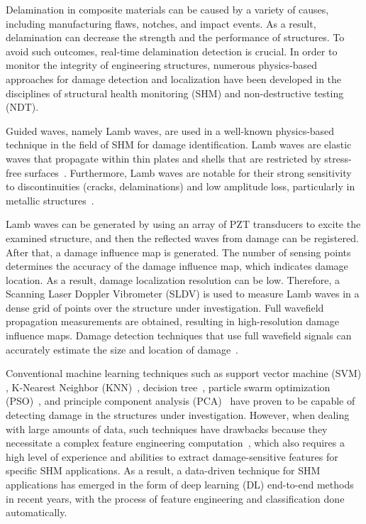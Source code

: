 \documentclass[runningheads]{llncs}
\begin{document}
Delamination in composite materials can be caused by a variety of causes, including manufacturing flaws, notches, and impact events.
As a result, delamination can decrease the strength and the performance of structures.
To avoid such outcomes, real-time delamination detection is crucial.
In order to monitor the integrity of engineering structures, numerous physics-based approaches for damage detection and localization have been developed in the disciplines of structural health monitoring (SHM) and non-destructive testing (NDT).

Guided waves, namely Lamb waves, are used in a well-known physics-based technique in the field of SHM for damage identification.
Lamb waves are elastic waves that propagate within thin plates and shells that are restricted by stress-free surfaces~\cite{mitra2016guided}.
Furthermore, Lamb waves are notable for their strong sensitivity to discontinuities (cracks, delaminations) and low amplitude loss, particularly in metallic structures~\cite{Keulen2014}.

Lamb waves can be generated by using an array of PZT transducers to excite the examined structure, and then the reflected waves from damage can be registered.
After that, a damage influence map is generated.
The number of sensing points determines the accuracy of the damage influence map, which indicates damage location.
As a result, damage localization resolution can be low.
Therefore, a Scanning Laser Doppler Vibrometer (SLDV) is used to measure Lamb waves in a dense grid of points over the structure under investigation.
Full wavefield propagation measurements are obtained, resulting in high-resolution damage influence maps.
Damage detection techniques that use full wavefield signals can accurately estimate the size and location of damage~\cite{Girolamo2018a, kudela2018impact}.

Conventional machine learning techniques such as support vector machine (SVM) \cite{noori2010application}, K-Nearest Neighbor (KNN)~\cite{Vitola2017}, decision tree~\cite{Mariniello2020}, particle swarm optimization (PSO)~\cite{Khatir2018}, and principle component analysis (PCA)~\cite{wang2014principal}
have proven to be capable of detecting damage in the structures under investigation.
However, when dealing with large amounts of data, such techniques have drawbacks because they necessitate a complex feature engineering computation~\cite{Gulgec2019}, which also requires a high level of experience and abilities to extract damage-sensitive features for specific SHM applications.
As a result, a data-driven technique for SHM applications has emerged in the form of deep learning (DL) end-to-end methods in recent years, with the process of feature engineering and classification done automatically.
\end{document}
